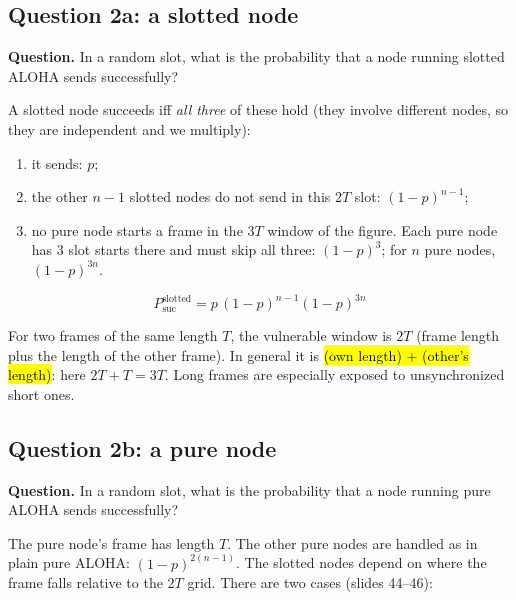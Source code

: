 \subsection*{Question 2a: a slotted node}
\textbf{Question.} In a random slot, what is the probability that a node running slotted ALOHA sends successfully?


A slotted node succeeds iff \emph{all three} of these hold (they involve different nodes, so they are independent and we multiply):
\begin{enumerate}
  \item it sends: $p$;
  \item the other $n-1$ slotted nodes do not send in this $2T$ slot: $(1-p)^{n-1}$;
  \item no pure node starts a frame in the $3T$ window of the figure. Each pure node has 3 slot starts there and must skip all three: $(1-p)^3$; for $n$ pure nodes, $(1-p)^{3n}$.
\end{enumerate}
\[ \boxed{\ P^{\text{slotted}}_{\text{suc}} = p\,(1-p)^{n-1}(1-p)^{3n}\ } \]

\begin{intuition}
For two frames of the same length $T$, the vulnerable window is $2T$ (frame length plus the length of the other frame). In general it is \hl{(own length) + (other's length)}: here $2T + T = 3T$.
Long frames are especially exposed to unsynchronized short ones.
\end{intuition}

\subsection*{Question 2b: a pure node}
\textbf{Question.} In a random slot, what is the probability that a node running pure ALOHA sends successfully?


The pure node's frame has length $T$. The other pure nodes are handled as in plain pure ALOHA: $(1-p)^{2(n-1)}$. The slotted nodes depend on where the frame falls relative to the $2T$ grid. There are two cases (slides 44--46):

\begin{center}
\end{center}


